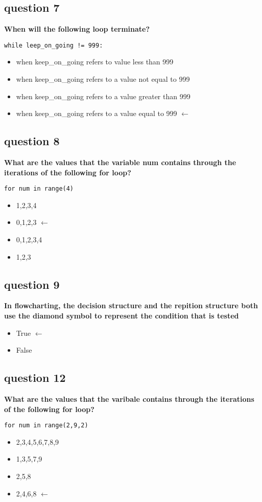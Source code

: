 \documentclass[10pt]{article}
\begin{document}
\subsection*{question 7}
\textbf{When will the following loop terminate?}
\begin{verbatim}
while leep_on_going != 999:
\end{verbatim}
\begin{itemize}
\item when keep\_on\_going refers to value less than 999
\item when keep\_on\_going refers to a value not equal to 999
\item when keep\_on\_going refers to a value greater than 999
\item when keep\_on\_going refers to a value equal to 999 $\leftarrow$
\end{itemize}
\subsection*{question 8}
\textbf{What are the values that the variable num contains through the iterations of the following for loop?}
\begin{verbatim}
for num in range(4)
\end{verbatim}
\begin{itemize}
\item 1,2,3,4 
\item 0,1,2,3 $\leftarrow$
\item 0,1,2,3,4
\item 1,2,3
\end{itemize}
\subsection*{question 9}
\textbf{In flowcharting, the decision structure and the repition structure both use the diamond symbol to represent the condition that is tested}
\begin{itemize}
\item True $\leftarrow$
\item False 
\end{itemize}
\subsection*{question 12}
\textbf{What are the values that the varibale contains through the iterations of the following for loop?}
\begin{verbatim}
for num in range(2,9,2)
\end{verbatim}
\begin{itemize}
\item 2,3,4,5,6,7,8,9
\item 1,3,5,7,9
\item 2,5,8
\item 2,4,6,8 $\leftarrow$
\end{itemize}
\end{document}
